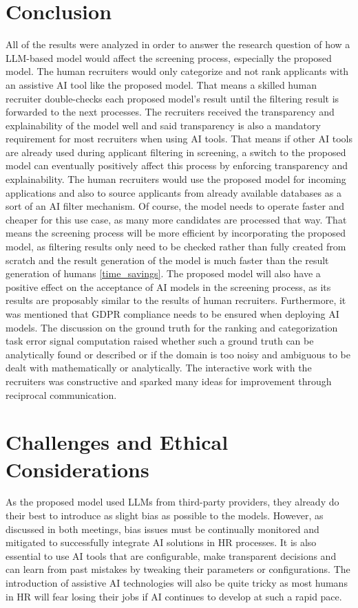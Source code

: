 \documentclass[draft,final]{thesisclass} %
\begin{document}
\section{Conclusion}
All of the results were analyzed in order to answer the research question of how a \gls{LLM}-based model would affect the screening process, especially the proposed model. The human recruiters would only categorize and not rank applicants with an assistive \acs{AI} tool like the proposed model. That means a skilled human recruiter double-checks each proposed model's result until the filtering result is forwarded to the next processes. The recruiters received the transparency and explainability of the model well and said transparency is also a mandatory requirement for most recruiters when using \acs{AI} tools. That means if other \acs{AI} tools are already used during applicant filtering in screening, a switch to the proposed model can eventually positively affect this process by enforcing transparency and explainability. The human recruiters would use the proposed model for incoming applications and also to source applicants from already available databases as a sort of an \acs{AI} filter mechanism. Of course, the model needs to operate faster and cheaper for this use case, as many more candidates are processed that way. That means the screening process will be more efficient by incorporating the proposed model, as filtering results only need to be checked rather than fully created from scratch and the result generation of the model is much faster than the result generation of humans \ref{time_savings}. The proposed model will also have a positive effect on the acceptance of \acs{AI} models in the screening process, as its results are proposably similar to the results of human recruiters.
Furthermore, it was mentioned that \acs{GDPR} compliance needs to be ensured when deploying \acs{AI} models. The discussion on the ground truth for the ranking and categorization task error signal computation raised whether such a ground truth can be analytically found or described or if the domain is too noisy and ambiguous to be dealt with mathematically or analytically. The interactive work with the recruiters was constructive and sparked many ideas for improvement through reciprocal communication. 

\section{Challenges and Ethical Considerations}
As the proposed model used \gls{LLM}s from third-party providers, they already do their best to introduce as slight bias as possible to the models. However, as discussed in both meetings, bias issues must be continually monitored and mitigated to successfully integrate \acs{AI} solutions in \acs{HR} processes. It is also essential to use \acs{AI} tools that are configurable, make transparent decisions and can learn from past mistakes by tweaking their parameters or configurations. The introduction of assistive \acs{AI} technologies will also be quite tricky as most humans in \acs{HR} will fear losing their jobs if \acs{AI} continues to develop at such a rapid pace.
\end{document}
